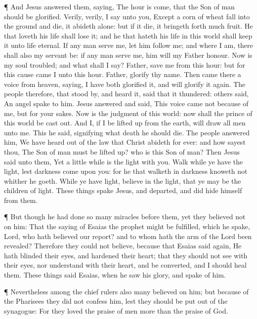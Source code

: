  ¶ And Jesus answered them, saying, The hour is come, that
the Son of man should be glorified.  Verily, verily, I say
unto you, Except a corn of wheat fall into the ground and die, it
abideth alone: but if it die, it bringeth forth much fruit.
 He that loveth his life shall lose it; and he that hateth
his life in this world shall keep it unto life eternal.  If
any man serve me, let him follow me; and where I am, there shall also my
servant be: if any man serve me, him will my Father honour.
 Now is my soul troubled; and what shall I say? Father,
save me from this hour: but for this cause came I unto this hour.
 Father, glorify thy name. Then came there a voice from
heaven, saying, I have both glorified it, and will glorify it again.
 The people therefore, that stood by, and heard it, said
that it thundered: others said, An angel spake to him. 
Jesus answered and said, This voice came not because of me, but for your
sakes.  Now is the judgment of this world: now shall the
prince of this world be cast out.  And I, if I be lifted up
from the earth, will draw all men unto me.  This he said,
signifying what death he should die.  The people answered
him, We have heard out of the law that Christ abideth for ever: and how
sayest thou, The Son of man must be lifted up? who is this Son of man?
 Then Jesus said unto them, Yet a little while is the light
with you. Walk while ye have the light, lest darkness come upon you: for
he that walketh in darkness knoweth not whither he goeth. 
While ye have light, believe in the light, that ye may be the children
of light. These things spake Jesus, and departed, and did hide himself
from them.

 ¶ But though he had done so many miracles before them, yet
they believed not on him:  That the saying of Esaias the
prophet might be fulfilled, which he spake, Lord, who hath believed our
report? and to whom hath the arm of the Lord been revealed?
 Therefore they could not believe, because that Esaias said
again,  He hath blinded their eyes, and hardened their
heart; that they should not see with their eyes, nor understand with
their heart, and be converted, and I should heal them. 
These things said Esaias, when he saw his glory, and spake of him.

 ¶ Nevertheless among the chief rulers also many believed
on him; but because of the Pharisees they did not confess him, lest they
should be put out of the synagogue:  For they loved the
praise of men more than the praise of God.

